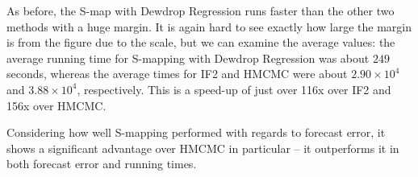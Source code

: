     As before, the S-map with Dewdrop Regression runs faster than the other two methods with a huge margin. It is again hard to see exactly how large the margin is from the figure due to the scale, but we can examine the average values: the average running time for S-mapping with Dewdrop Regression was about $249$ seconds, whereas the average times for IF2 and HMCMC were about $2.90 \times 10^4$ and $3.88 \times 10^4$, respectively. This is a speed-up of just over 116x over IF2 and 156x over HMCMC.

    Considering how well S-mapping performed with regards to forecast error, it shows a significant advantage over HMCMC in particular -- it outperforms it in both forecast error and running times.

